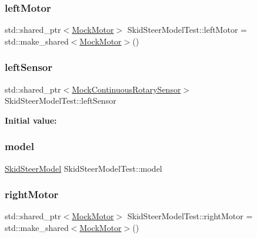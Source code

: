 \subsubsection{\texorpdfstring{leftMotor}{leftMotor}}
{\footnotesize\ttfamily std\+::shared\+\_\+ptr$<$\mbox{\hyperlink{classokapi_1_1MockMotor}{Mock\+Motor}}$>$ Skid\+Steer\+Model\+Test\+::left\+Motor = std\+::make\+\_\+shared$<$\mbox{\hyperlink{classokapi_1_1MockMotor}{Mock\+Motor}}$>$()}

\mbox{\label{classSkidSteerModelTest_a915681d0e1c2f96b08f0dbb5fcd07410}} 
\subsubsection{\texorpdfstring{leftSensor}{leftSensor}}
{\footnotesize\ttfamily std\+::shared\+\_\+ptr$<$\mbox{\hyperlink{classokapi_1_1MockContinuousRotarySensor}{Mock\+Continuous\+Rotary\+Sensor}}$>$ Skid\+Steer\+Model\+Test\+::left\+Sensor}

{\bfseries Initial value\+:}
\begin{DoxyCode}{0}
\DoxyCodeLine{=}

\end{DoxyCode}
\mbox{\label{classSkidSteerModelTest_ab890f166fd5c2c83b2dc9ffecc5eb0ca}} 
\subsubsection{\texorpdfstring{model}{model}}
{\footnotesize\ttfamily \mbox{\hyperlink{classokapi_1_1SkidSteerModel}{Skid\+Steer\+Model}} Skid\+Steer\+Model\+Test\+::model}

\mbox{\label{classSkidSteerModelTest_a77ee903c3e5bb6d5bb9281c34790ac29}} 
\subsubsection{\texorpdfstring{rightMotor}{rightMotor}}
{\footnotesize\ttfamily std\+::shared\+\_\+ptr$<$\mbox{\hyperlink{classokapi_1_1MockMotor}{Mock\+Motor}}$>$ Skid\+Steer\+Model\+Test\+::right\+Motor = std\+::make\+\_\+shared$<$\mbox{\hyperlink{classokapi_1_1MockMotor}{Mock\+Motor}}$>$()}

